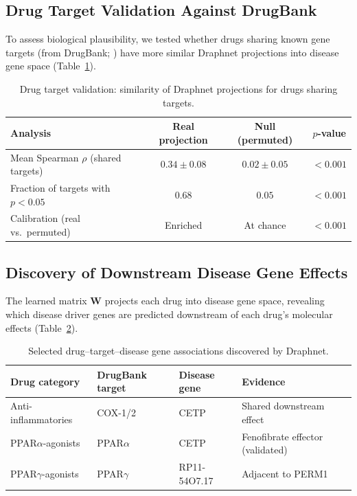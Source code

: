 \documentclass[11pt]{article}
\begin{document}
\subsection{Drug Target Validation Against DrugBank}

To assess biological plausibility, we tested whether drugs sharing known gene targets (from DrugBank; \citealt{wishart2018drugbank}) have more similar Draphnet projections into disease gene space (Table~\ref{tab:target_val}).

\begin{table}[H]
\centering
\caption{Drug target validation: similarity of Draphnet projections for drugs sharing targets.}
\label{tab:target_val}
\begin{tabular}{lccc}
\toprule
\textbf{Analysis} & \textbf{Real projection} & \textbf{Null (permuted)} & \textbf{$p$-value} \\
\midrule
Mean Spearman $\rho$ (shared targets) & $0.34 \pm 0.08$ & $0.02 \pm 0.05$ & $<0.001$ \\
Fraction of targets with $p < 0.05$ & $0.68$ & $0.05$ & $<0.001$ \\
Calibration (real vs.\ permuted) & Enriched & At chance & $<0.001$ \\
\bottomrule
\end{tabular}
\end{table}

\subsection{Discovery of Downstream Disease Gene Effects}

The learned matrix $\mathbf{W}$ projects each drug into disease gene space, revealing which disease driver genes are predicted downstream of each drug's molecular effects (Table~\ref{tab:discoveries}).

\begin{table}[H]
\centering
\caption{Selected drug--target--disease gene associations discovered by Draphnet.}
\label{tab:discoveries}
\begin{tabular}{llll}
\toprule
\textbf{Drug category} & \textbf{DrugBank target} & \textbf{Disease gene} & \textbf{Evidence} \\
\midrule
Anti-inflammatories & COX-1/2 & CETP & Shared downstream effect \\
PPAR$\alpha$-agonists & PPAR$\alpha$ & CETP & Fenofibrate effector (validated) \\
PPAR$\gamma$-agonists & PPAR$\gamma$ & RP11-54O7.17 & Adjacent to PERM1 \\
\bottomrule
\end{tabular}
\end{table}
\end{document}
